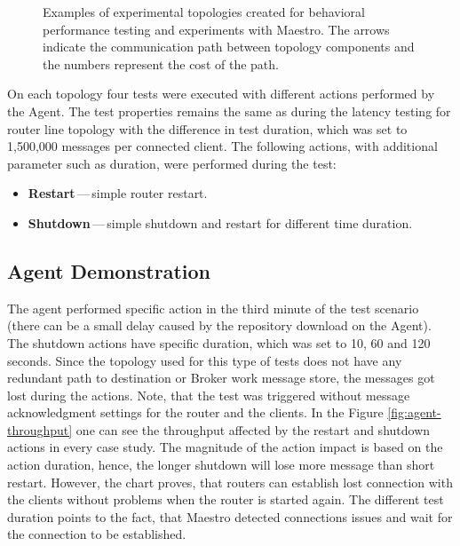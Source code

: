 \begin{figure}[h]
\begin{minipage}{0.45\linewidth}
	\end{minipage}
	\caption[Examples of experimental topologies created for behavioral performance testing and experiments with Maestro.]{Examples of experimental topologies created for behavioral performance testing and experiments with Maestro. The arrows indicate the communication path between topology components and the numbers represent the cost of the path.}\label{fig:agent_topologies}
\end{figure}

On each topology four tests were executed with different actions performed by the Agent. The test properties remains the same as during the latency testing for router line topology with the difference in test duration, which was set to 1,500,000 messages per connected client. The following actions, with additional parameter such as duration, were performed during the test:

\begin{itemize}
	\setlength\itemsep{0em}
	\item \textbf{Restart}\,---\,simple router restart.
	\item \textbf{Shutdown}\,---\,simple shutdown and restart for different time duration.
\end{itemize}

\subsection{Agent Demonstration}
\label{Agent Demonstration}
The agent performed specific action in the third minute of the test scenario (there can be a small delay caused by the repository download on the Agent). The shutdown actions have specific duration, which was set to 10, 60 and 120 seconds. Since the topology used for this type of tests does not have any redundant path to destination or Broker work message store, the messages got lost during the actions. Note, that the test was triggered without message acknowledgment settings for the router and the clients. In the Figure \ref{fig:agent-throughput} one can see the throughput affected by the restart and shutdown actions in every case study. The magnitude of the action impact is based on the action duration, hence, the longer shutdown will lose more message than short restart. However, the chart proves, that routers can establish lost connection with the clients without problems when the router is started again. The different test duration points to the fact, that Maestro detected connections issues and wait for the connection to be established.

